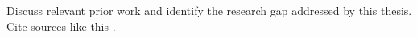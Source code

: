 Discuss relevant prior work and identify the research gap addressed by this
thesis. Cite sources like this \cite{example2024}.
